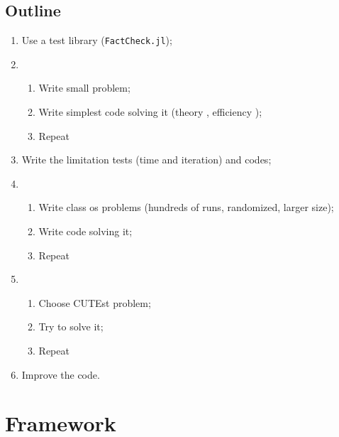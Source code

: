
\subsection{Outline}

\begin{frame}[t,fragile]
  \begin{enumerate}
    \setlength{\itemsep}{0pt}
    \item<1-> Use a test library (\texttt{FactCheck.jl});
    \item<2->
    \begin{enumerate}
      \item Write small problem;
      \item Write simplest code solving it (theory \yes, efficiency \no);
      \item Repeat
    \end{enumerate}
    \item<3-> Write the limitation tests (time and iteration) and codes;
    \item<4->
    \begin{enumerate}
      \item Write class os problems (hundreds of runs, randomized, larger size);
      \item Write code solving it;
      \item Repeat
    \end{enumerate}
    \item<5->
    \begin{enumerate}
      \item Choose CUTEst problem;
      \item Try to solve it;
      \item Repeat
    \end{enumerate}
    \item<6-> Improve the code.
  \end{enumerate}
\end{frame}

\section{Framework}

